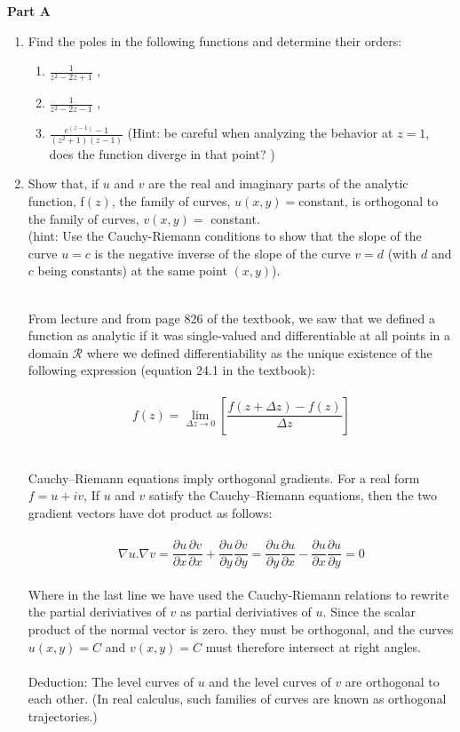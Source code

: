 \documentclass[fleqn]{article}
\begin{document}
  \textbf{Part A}
  \begin{enumerate}

    \item Find the poles in the following functions and determine their orders:
      \begin{enumerate}
        \item  $\frac{1}{z^2 - 2z + 1}$ , 
        \item  $\frac{1}{z^2 - 2z - 1}$ , 
        \item  $\frac{e^{(z-1)} - 1}{(z^2 + 1) (z - 1)}$  (Hint: be careful when analyzing the behavior at $z=1$, does the function diverge in that point? )
      \end{enumerate}

    \item Show that, if $u$ and $v$ are the real and imaginary parts of the analytic function, f$ (z)$,
    the family of curves, $u(x, y) = $constant, is orthogonal to the family of curves, $v(x, y) =$ constant.\\
    (hint: Use the Cauchy-Riemann conditions to show that the slope of the curve $u = c$ is the negative inverse of the slope of the curve $v = d$ (with $d$ and $c$ being constants) at the same point $(x, y)$). 

    \textcolor{hwColor}{
      \\
      From lecture and from page 826 of the textbook, we saw that we defined a function as analytic 
      if it was single-valued and differentiable at all points in a domain $\mathcal{R}$ where we defined differentiability 
      as the unique existence of the following expression (equation 24.1 in the textbook): \\
      \\
      $$f(z)=\lim\limits_{\Delta z \to 0} \left[\dfrac{f(z+\Delta z)-f(z)}{\Delta z}\right]$$ \\
      \\
      Cauchy–Riemann equations imply orthogonal gradients. For a real form $f=u+i v$, If $u$ and $v$ satisfy 
      the Cauchy–Riemann equations, then the two gradient vectors have dot product as follows: \\
      \\
      $$\nabla u. \nabla v
      =\dfrac{\partial u}{\partial x} \dfrac{\partial v}{\partial x}+\dfrac{\partial u}{\partial y} \dfrac{\partial v}{\partial y}
      =\dfrac{\partial u}{\partial y} \dfrac{\partial u}{\partial x}-\dfrac{\partial u}{\partial x}\dfrac{\partial u}{\partial y}
      =0$$
      \\
      Where in the last line we have used the Cauchy-Riemann relations to rewrite the partial 
      deriviatives of $v$ as partial deriviatives of $u$. Since the scalar product of the 
      normal vector is zero. they must be orthogonal, and the curves $u(x,y)=C$ and $v(x,y)=C$ must
      therefore intersect at right angles. \\
      \\
      Deduction: The level curves of $u$ and the level curves of $v$ are orthogonal to each other.
      (In real calculus, such families of curves are known as orthogonal trajectories.)
    }

  \end{enumerate}
\end{document}
